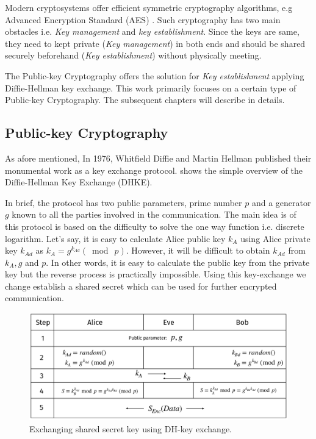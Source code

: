 Modern cryptosystems offer efficient symmetric cryptography algorithms, e.g Advanced Encryption Standard (AES) \cite{AES_DaemenR02}.
Such cryptography has two main obstacles i.e. \textit{Key management} and \textit{key establishment}.
Since the keys are same, they need to kept private (\textit{Key management})  in both ends and should be shared securely beforehand (\textit{Key establishment}) without physically meeting.

The Public-key Cryptography offers the solution for \textit{Key establishment} applying Diffie-Hellman key exchange.
This work primarily focuses on a certain type of Public-key Cryptography. 
The subsequent chapters will describe in details.

\subsection{Public-key Cryptography}
\label{ch1_subsec_pkc}
As afore mentioned, In 1976, Whitfield Diffie and Martin Hellman published their monumental work as a key exchange  protocol\cite{diffie1976new}.  
 shows the simple overview of the Diffie-Hellman Key Exchange (DHKE).

In brief, the protocol has two public parameters, prime number $p$ and a generator $g$ known to all the parties involved in the communication.
The main idea is of this protocol is based on the difficulty to solve the one way function i.e. discrete logarithm.
Let's say, it is easy to calculate Alice public key $k_A$ using Alice private key $k_{Ad}$ as $k_A = g^{k_{Ad}} (\bmod ~p).$ 
However, it will be difficult to obtain $k_{Ad}$ from $k_A, g$ and $p$.
In other words, it is easy to calculate the public key from the private key but the reverse process is practically impossible.
Using this key-exchange we change establish a shared secret which can be used for further encrypted communication.

  \begin{figure}
	\centering
	\includegraphics[width=.9\linewidth, height=.67\textheight, keepaspectratio]{Figures/DHKE}
	\caption{Exchanging shared secret key using DH-key exchange.}
	\label{fig_DHKE}
\end{figure}

